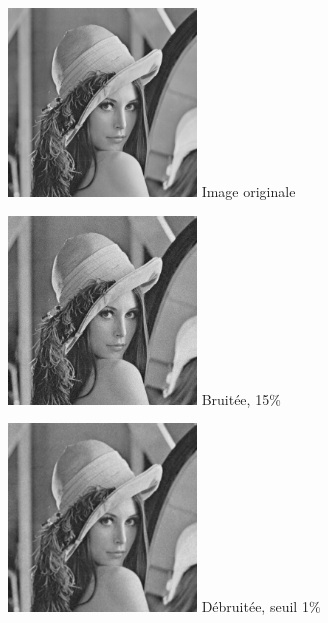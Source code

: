 \documentclass{article}
\begin{document}
		\begin{figure}[!ht]
			\centering
			\begin{minipage}[t]{5cm}
				\centering
				\includegraphics[width=5cm,height=5cm]{lena.jpg}
				Image originale
			\end{minipage}
			\begin{minipage}[t]{5cm}
				\centering
				\includegraphics[width=5cm,height=5cm]{Gaussian/noisy_15.jpg}
				Bruitée, 15\%
			\end{minipage}
			\begin{minipage}[t]{5cm}
				\centering
				\includegraphics[width=5cm,height=5cm]{Gaussian/algo_1.jpg}
				Débruitée, seuil 1\%
			\end{minipage}
		\end{figure}
		
\end{document}
